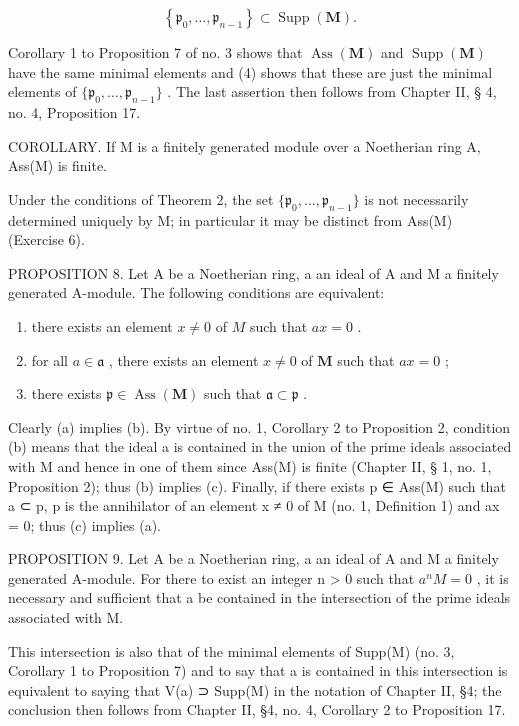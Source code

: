 \[
\left\{\mathfrak {p} _ {0}, \dots , \mathfrak {p} _ {n - 1} \right\} \subset \operatorname{Supp} (\mathbf {M}).
\]

Corollary 1 to Proposition 7 of no. 3 shows that \(\operatorname{Ass}(\mathbf{M})\) and \(\operatorname{Supp}(\mathbf{M})\) have the same minimal elements and (4) shows that these are just the minimal elements of \(\{\mathfrak{p}_0, \ldots, \mathfrak{p}_{n-1}\}\) . The last assertion then follows from Chapter II, § 4, no. 4, Proposition 17.

COROLLARY. If M is a finitely generated module over a Noetherian ring A, Ass(M) is finite.

Under the conditions of Theorem 2, the set \(\{\mathfrak{p}_0,\ldots ,\mathfrak{p}_{n - 1}\}\) is not necessarily determined uniquely by M; in particular it may be distinct from Ass(M) (Exercise 6).

PROPOSITION 8. Let A be a Noetherian ring, a an ideal of A and M a finitely generated A-module. The following conditions are equivalent:

\begin{enumerate}
\def\labelenumi{(\alph{enumi})}
\item
  there exists an element \(x \neq 0\) of \(M\) such that \(ax = 0\) .
\item
  for all \(a \in \mathfrak{a}\) , there exists an element \(x \neq 0\) of \(\mathbf{M}\) such that \(ax = 0\) ;
\item
  there exists \(\mathfrak{p} \in \operatorname{Ass}(\mathbf{M})\) such that \(\mathfrak{a} \subset \mathfrak{p}\) .
\end{enumerate}

Clearly (a) implies (b). By virtue of no. 1, Corollary 2 to Proposition 2, condition (b) means that the ideal a is contained in the union of the prime ideals associated with M and hence in one of them since Ass(M) is finite (Chapter II, § 1, no. 1, Proposition 2); thus (b) implies (c). Finally, if there exists p ∈ Ass(M) such that a ⊂ p, p is the annihilator of an element x ≠ 0 of M (no. 1, Definition 1) and ax = 0; thus (c) implies (a).

PROPOSITION 9. Let A be a Noetherian ring, a an ideal of A and M a finitely generated A-module. For there to exist an integer n \textgreater{} 0 such that \(a^{n}M = 0\) , it is necessary and sufficient that a be contained in the intersection of the prime ideals associated with M.

This intersection is also that of the minimal elements of Supp(M) (no. 3, Corollary 1 to Proposition 7) and to say that a is contained in this intersection is equivalent to saying that V(a) ⊃ Supp(M) in the notation of Chapter II, §4; the conclusion then follows from Chapter II, §4, no. 4, Corollary 2 to Proposition 17.

